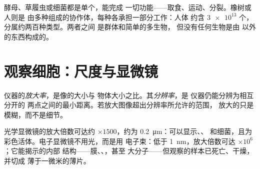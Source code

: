 \begin{example}[单细胞还是多细胞]\label{ex:g10:cells-common-unit:onemany}
酵母、草履虫或细菌都是单个，能完成
一切功能——取食、运动、分裂。橡树或人则是
由多种组成的协作体，每种各承担一部分工作：人体
约含 $\num{3e13}$ 个，分属约两百种类型。两者之间
是群体和简单的多生物，
但没有任何生物是由
以外的东西构成的。
\end{example}

\section{观察细胞：尺度与显微镜}

\begin{definition}[放大率与分辨率]\label{def:g10:cells-common-unit:magnification}
仪器的\emph{放大率}，是像的大小与
物体大小之比。其\emph{分辨率}，是
仪器仍能分辨为相互分开的
两点之间的最小距离。若放大图像超出分辨率所允许的范围，
放大的只是模糊，而不是细节。
\end{definition}

\begin{proposition}\label{prop:g10:cells-common-unit:microscopes}
光学显微镜的放大倍数可达约 $\times 1500$，约为
\qty{0.2}{\micro m}：可以显示、、
和细菌，且为彩色活体。电子显微镜不用光，而是用
电子束：低于
\qty{1}{nm}，放大倍数可达 $\times 10^6$；它能揭示的内部
结构——膜、、，甚至
大分子——但观察的样本已死亡、干燥，并切成
薄于一微米的薄片。
\end{proposition}
\admitted

